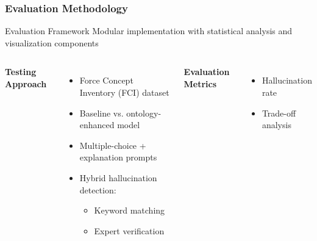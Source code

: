 \documentclass{beamer}
\begin{document}
\begin{frame}
\frametitle{Evaluation Methodology}

\begin{alertblock}{Evaluation Framework}
Modular implementation with statistical analysis and visualization components
\end{alertblock}

\begin{columns}
\textbf{Testing Approach}
\begin{itemize}
    \item Force Concept Inventory (FCI) dataset
    \item Baseline vs. ontology-enhanced model
    \item Multiple-choice + explanation prompts
    \item Hybrid hallucination detection:
    \begin{itemize}
        \item Keyword matching
        \item Expert verification
    \end{itemize}
\end{itemize}

\textbf{Evaluation Metrics}
\begin{itemize}
    \item Hallucination rate
    \item Trade-off analysis
\end{itemize}
\end{columns}
\end{frame}
\end{document}
